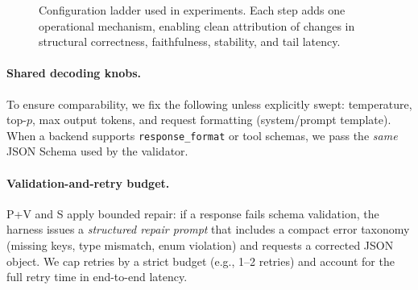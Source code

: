 \documentclass[11pt]{article}
\begin{document}
\begin{figure}[t]
\centering
{}
\caption{Configuration ladder used in experiments.
Each step adds one operational mechanism, enabling clean attribution of changes in structural correctness, faithfulness, stability, and tail latency.}
\label{fig:config-ladder}
\end{figure}

\paragraph{Shared decoding knobs.}
To ensure comparability, we fix the following unless explicitly swept:
temperature, top-$p$, max output tokens, and request formatting (system/prompt template).
When a backend supports \texttt{response\_format} or tool schemas, we pass the \emph{same} JSON Schema used by the validator.

\paragraph{Validation-and-retry budget.}
P+V and S apply bounded repair: if a response fails schema validation, the harness issues a \emph{structured repair prompt} that includes a compact error taxonomy (missing keys, type mismatch, enum violation) and requests a corrected JSON object.
We cap retries by a strict budget (e.g., 1--2 retries) and account for the full retry time in end-to-end latency.
\end{document}
